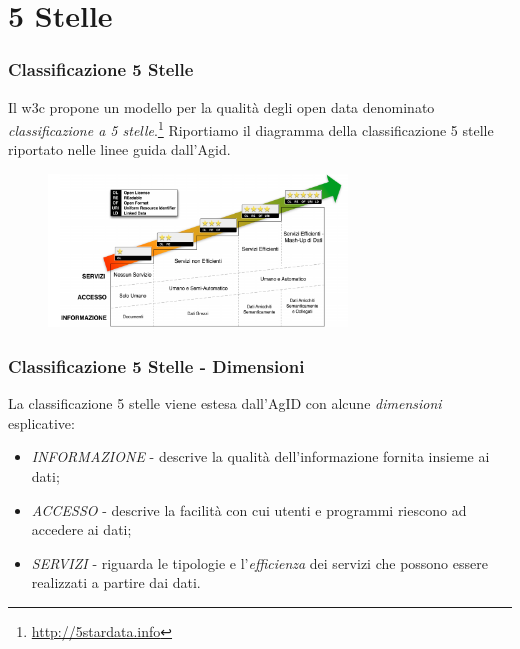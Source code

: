 \documentclass[8pt]{beamer}
\begin{document}
\section{5 Stelle}

\begin{frame}
  \frametitle{Classificazione 5 Stelle}

  Il w3c propone un modello per la qualit\`a degli open data denominato
  \emph{classificazione a 5 stelle}.\footnote{\url{http://5stardata.info}}
  Riportiamo il diagramma della classificazione 5 stelle riportato nelle linee
  guida dall'Agid.
  \vspace{\baselineskip}  
  
  \begin{figure}
     \includegraphics[width=300px]{5stelle_classificazione.png} 
  \end{figure}
\end{frame}

\begin{frame}
  \frametitle{Classificazione 5 Stelle - Dimensioni}
  La classificazione 5 stelle viene estesa dall'AgID con alcune \emph{dimensioni}
  esplicative:
  \begin{itemize}[<+->]
   \item \emph{INFORMAZIONE} - descrive la qualit\`a dell'informazione fornita insieme ai dati;
   \item \emph{ACCESSO} -  descrive la facilit\`a con cui utenti e programmi riescono ad accedere ai dati;
   \item \emph{SERVIZI} - riguarda le tipologie e l'\emph{efficienza} dei servizi che possono essere realizzati a partire 
   dai dati.
  \end{itemize}
\end{frame}
\end{document}

